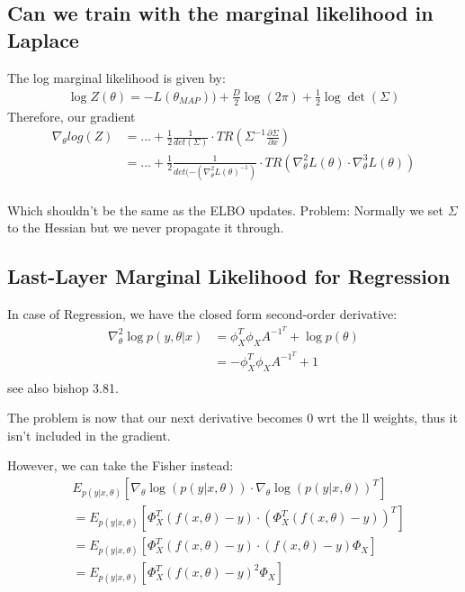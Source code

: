 \documentclass[a4paper]{scrartcl}
\begin{document}
\subsection{Can we train with the marginal likelihood in Laplace}
The log marginal likelihood is given by:
\begin{align*}
    \log Z(\theta) =-L(\theta_{MAP}))+ \frac{D}{2}\log(2\pi) + \frac{1}{2}\log\det(\Sigma)
\end{align*}
Therefore, our gradient 
\begin{align}
    \nabla_\theta log(Z) 
    &= ... + \frac{1}{2} \frac{1}{det(\Sigma)}\cdot TR(\Sigma^{-1} \frac{\partial \Sigma}{\partial x})\\
    &= ... + \frac{1}{2} \frac{1}{det(-(\nabla^2_\theta L(\theta)^{-1})}\cdot TR(\nabla^2_\theta L(\theta) \cdot  \nabla^3_\theta L(\theta))\\
\end{align}

Which shouldn't be the same as the ELBO updates. Problem: Normally
we set $\Sigma$ to the Hessian but we never propagate it through. 

\subsection{Last-Layer Marginal Likelihood for Regression}
  In case of Regression, we have the closed form second-order derivative:
  \begin{align}
    \nabla^2_\theta \log p(y, \theta \vert x) &= \phi_X^T \phi_X A^{-1^T} + \log p(\theta)\\
    &= - \phi_X^T \phi_X A^{-1^T} + 1\\
  \end{align}
  see also bishop 3.81.

  The problem is now that our next derivative becomes 0 wrt the ll weights, thus
  it isn't included in the gradient.

  However, we can take the Fisher instead:
  \begin{align}
    &E_{p(y \vert x, \theta)}[\nabla_\theta \log(p(y \vert x, \theta)) \cdot \nabla_\theta \log(p(y \vert x, \theta))^T]\\
    &= E_{p(y \vert x, \theta)}[\Phi_X^T (f(x, \theta) - y) \cdot (\Phi_X^T (f(x, \theta) - y))^T]\\
    &= E_{p(y \vert x, \theta)}[\Phi_X^T (f(x, \theta) - y) \cdot (f(x, \theta) - y) \Phi_X ]\\
    &= E_{p(y \vert x, \theta)}[\Phi_X^T (f(x, \theta) - y)^2 \Phi_X ]\\
  \end{align}
\end{document}

